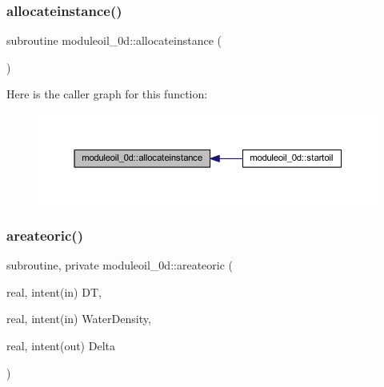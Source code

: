 \subsubsection{\texorpdfstring{allocateinstance()}{allocateinstance()}}
{\footnotesize\ttfamily subroutine moduleoil\+\_\+0d\+::allocateinstance (\begin{DoxyParamCaption}{ }\end{DoxyParamCaption})\hspace{0.3cm}{\ttfamily [private]}}

Here is the caller graph for this function\+:\nopagebreak
\begin{figure}[H]
\begin{center}
\leavevmode
\includegraphics[width=350pt]{namespacemoduleoil__0d_a90135088740373e7de26e5316c979963_icgraph}
\end{center}
\end{figure}
\mbox{\label{namespacemoduleoil__0d_ae124c13fd1eb9319a89b0b5eb325d0be}} 
\subsubsection{\texorpdfstring{areateoric()}{areateoric()}}
{\footnotesize\ttfamily subroutine, private moduleoil\+\_\+0d\+::areateoric (\begin{DoxyParamCaption}\item[{real, intent(in)}]{DT,  }\item[{real, intent(in)}]{Water\+Density,  }\item[{real, intent(out)}]{Delta }\end{DoxyParamCaption})\hspace{0.3cm}{\ttfamily [private]}}

